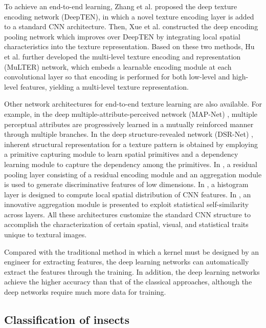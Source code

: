 \documentclass{aci}
\numberwithin{equation}{section}
\begin{document}
To achieve an end-to-end learning, Zhang et al. \cite{zhang_deep_2017} proposed
the deep texture encoding network (DeepTEN), in which a novel texture encoding
layer is added to a standard CNN architecture. Then, Xue et al.
\cite{xue_deep_2018} constructed the deep encoding pooling network which
improves over DeepTEN by integrating local spatial characteristics into the
texture representation. Based on these two methods, Hu et al. \cite{hu_multi_2019}
further developed the multi-level texture encoding and representation (MuLTER)
network, which embeds a learnable encoding module at each convolutional layer so
that encoding is performed for both low-level and high-level features, yielding
a multi-level texture representation.

Other network architectures for end-to-end texture learning are also available.
For example, in the deep multiple-attribute-perceived network (MAP-Net)
\cite{zhai_deep_2019}, multiple perceptual attributes are progressively learned
in a mutually reinforced manner through multiple branches. In the deep
structure-revealed network (DSR-Net) \cite{zhai_deep_2020}, inherent structural
representation for a texture pattern is obtained by employing a primitive
capturing module to learn spatial primitives and a dependency learning module to
capture the dependency among the primitives. In \cite{mao_deep_2021}, a residual
pooling layer consisting of a residual encoding module and an aggregation module
is used to generate discriminative features of low dimensions. In
\cite{peeples_histogram_2021}, a histogram layer is designed to compute local
spatial distribution of CNN features. In \cite{chen_deep_2021}, an innovative
aggregation module is presented to exploit statistical self-similarity across
layers. All these architectures customize the standard CNN structure to
accomplish the characterization of certain spatial, visual, and statistical
traits unique to textural images.

Compared with the traditional method in which a kernel must be designed by an
engineer for extracting features, the deep learning networks can automatically
extract the features through the training. In addition, the deep learning
networks achieve the higher accuracy than that of the classical approaches,
although the deep networks require much more data for training.

\subsection{Classification of insects}
\end{document}
